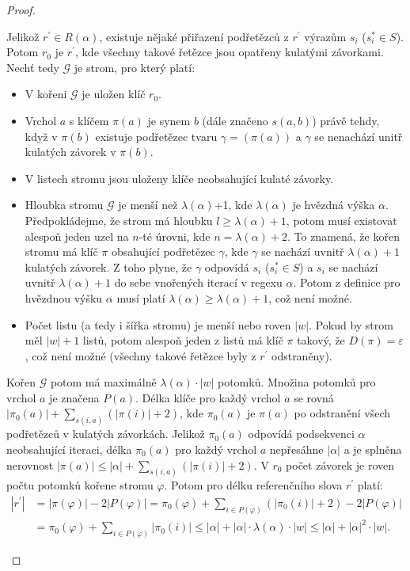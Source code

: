\documentclass[thesis=B,czech]{FITthesis}[2019/12/23]
\theoremstyle{definition}
\begin{document}
\begin{proof}
\begin{itemize}
{	Jelikož $r^\prime \in R(\alpha)$, existuje nějaké přiřazení podřetězců z $r^\prime$ výrazům $s_i$ ($s_i^\ast \in S$). Potom $r_0$ je $r^\prime$, kde všechny takové řetězce jsou opatřeny kulatými závorkami. Nechť tedy $\mathcal{G}$ je strom, pro který platí:
	\begin{itemize}  \item{V kořeni $\mathcal{G}$ je uložen klíč $r_0$.}
				\item{Vrchol $a$ s klíčem $\pi(a)$ je synem $b$ (dále značeno $s(a, b)$) právě tehdy, když v $\pi(b)$ existuje podřetězec tvaru $\gamma= (\pi(a))$ a $\gamma$ se nenachází unitř kulatých závorek v $\pi(b)$.}
				\item{V listech stromu jsou uloženy klíče neobsahující kulaté závorky.}
				\item{Hloubka stromu $\mathcal{G}$ je menší než $\lambda(\alpha)$+1, kde $\lambda(\alpha)$ je hvězdná výška $\alpha$. Předpokládejme, že strom má hloubku $l \ge \lambda(\alpha)+1$, potom musí existovat alespoň jeden uzel na $n$-té úrovni, kde $n = \lambda(\alpha)+2$. To znamená, že kořen stromu má klíč $\pi$ obsahující podřetězec $\gamma$, kde $\gamma$ se nachází uvnitř $\lambda(\alpha)+1$ kulatých závorek. Z toho plyne, že $\gamma$ odpovídá $s_i$ ($s_i^\ast \in S$) a $s_i$ se nachází uvnitř $\lambda(\alpha)+1$ do sebe vnořených iterací v regexu $\alpha$. Potom z definice pro hvězdnou výšku $\alpha$ musí platí $\lambda(\alpha) \ge \lambda(\alpha)+1$, což není možné.}
				\item{Počet listu (a tedy i šířka stromu) je menší nebo roven $|w|$. Pokud by strom měl $|w|+1$ listů, potom alespoň jeden z listů má klíč $\pi$ takový, že $D(\pi)=\varepsilon$, což není možné (všechny takové řetězce byly z $r^\prime$ odstraněny).}
	\end{itemize}
Kořen $\mathcal{G}$ potom má maximálně $\lambda(\alpha)\cdot|w|$ potomků. Množina potomků pro vrchol $a$ je značena $P(a)$. Délka klíče pro každý vrchol $a$ se rovná $|\pi_{0}(a)| + \sum_{s(i, a)}(|\pi(i)|+2)$, kde $\pi_{0}(a)$ je $\pi(a)$ po odstranění všech podřetězců v kulatých závorkách. Jelikož $\pi_{0}(a)$ odpovídá podsekvenci $\alpha$ neobsahující iteraci, délka $\pi_{0}(a)$ pro každý vrchol $a$ nepřesáhne $|\alpha|$ a je splněna nerovnost $|\pi(a)| \le |\alpha| + \sum_{s(i, a)}(|\pi(i)|+2)$. V $r_0$ počet závorek je roven počtu potomků kořene stromu $\varphi$. Potom pro délku referenčního slova $r^\prime$ platí: 
\begin{equation*}\begin{split}|r^{\prime}|&=|\pi(\varphi)|-2|P(\varphi)|=\pi_0(\varphi)+\sum_{i \in P(\varphi)}(|\pi_{0}(i)|+2) - 2|P(\varphi)| \\&= \pi_{0}(\varphi)+\sum_{i \in P(\varphi)}|\pi_{0}(i)| \le |\alpha|+|\alpha|\cdot\lambda(\alpha)\cdot|w| \le |\alpha|+|\alpha|^2\cdot|w|.
\end{split}\end{equation*}
	}
\end{itemize}
\end{proof}
\end{document}
